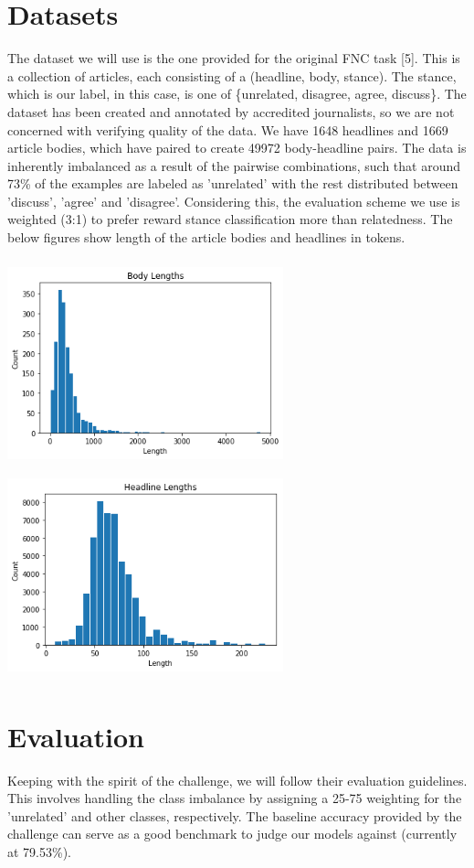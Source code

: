 \documentclass[11pt]{extarticle}
\begin{document}
\section{Datasets}
The dataset we will use is the one provided for the original FNC task [5]. This is a collection of articles, each consisting of a (headline, body, stance). The stance, which is our label, in this case, is one of \{unrelated, disagree, agree, discuss\}. The dataset has been created and annotated by accredited journalists, so we are not concerned with verifying quality of the data. We have 1648 headlines and 1669 article bodies, which have paired to create 49972 body-headline pairs. The data is inherently imbalanced as a result of the pairwise combinations, such that around 73\% of the examples are labeled as 'unrelated' with the rest distributed between 'discuss', 'agree' and 'disagree'. Considering this, the evaluation scheme we use is weighted (3:1) to prefer reward stance classification more than relatedness. The below figures show length of the article bodies and headlines in tokens.

\begin{center}
\includegraphics[width=8cm, height=6cm]{Dataset-body.png}
\includegraphics[width=8cm, height=6cm]{dataset-headlines.png}
\end{center}

\section{Evaluation}
Keeping with the spirit of the challenge, we will follow their evaluation guidelines. This involves handling the class imbalance by assigning a 25-75 weighting for the 'unrelated' and other classes, respectively. The baseline accuracy provided by the challenge can serve as a good benchmark to judge our models against (currently at 79.53\%).
\end{document}
